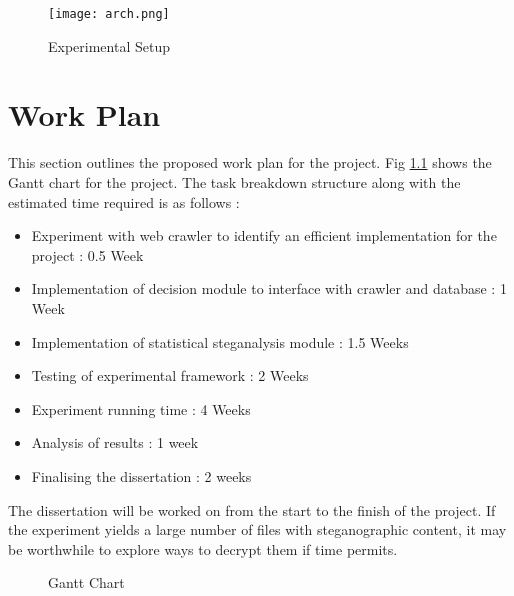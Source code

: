 \documentclass[12pt]{extreport}
\begin{document}
\begin{center}
\begin{figure}
\texttt{[image: arch.png]}
\caption{Experimental Setup}
\label{fig:setup}
\end{figure}
\end{center}
 

\chapter{Work Plan}
\label{ch:workplan}
This section outlines the proposed work plan for the project.  Fig \ref{fig:gantt} shows the Gantt chart for the project. The task breakdown structure along with the estimated time required is as follows :
\begin{itemize}
  \item Experiment with web crawler to identify an efficient implementation for the project : 0.5 Week
  \item Implementation of decision module to interface with crawler and database : 1 Week
  \item Implementation of statistical steganalysis module : 1.5 Weeks
  \item Testing of experimental framework : 2 Weeks
  \item Experiment running time : 4 Weeks
  \item Analysis of results : 1 week
  \item Finalising the dissertation : 2 weeks 
\end{itemize}  
  The dissertation will be worked on from the start to the finish of the project. If the experiment yields a large number of files with steganographic content, it may be worthwhile to explore ways to decrypt them  if time permits.
  
\begin{figure}

\begin{gantt}{9}{14}
    \begin{ganttitle}
    \end{ganttitle}
   \begin{ganttitle}
    \end{ganttitle}
  \end{gantt}
  \caption{Gantt Chart}
  \label{fig:gantt}

\end{figure}
\end{document}
